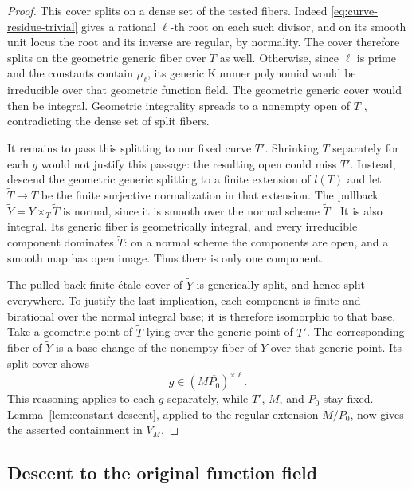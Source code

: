\begin{proof}
This cover splits on a dense set of the tested fibers.  Indeed
\eqref{eq:curve-residue-trivial} gives a rational $\ell$-th root on each
such divisor, and on its smooth unit locus the root and its inverse are
regular, by normality.  The cover therefore splits on the geometric
generic fiber over $T$ as well.  Otherwise, since $\ell$ is prime and
the constants contain $\mu_\ell$, its generic Kummer polynomial would
be irreducible over that geometric function field.  The geometric generic
cover would then be integral.  Geometric integrality spreads to a
nonempty open of $T$
\cite[Tags~\texttt{0578} and~\texttt{0559}]{Stacks}, contradicting the
dense set of split fibers.

It remains to pass this splitting to our fixed curve $T'$.  Shrinking $T$
separately for each $g$ would not justify this passage: the resulting open
could miss $T'$.  Instead, descend the geometric generic splitting to a
finite extension of $l(T)$ and let $\widetilde T\to T$ be the finite
surjective normalization in that extension.  The pullback
$\widetilde Y=Y\times_T\widetilde T$ is normal, since it is smooth over
the normal scheme $\widetilde T$ \cite[Tag~\texttt{034F}]{Stacks}.
It is also integral.  Its generic
fiber is geometrically integral, and every irreducible component dominates
$\widetilde T$: on a normal scheme the components are open, and a smooth
map has open image.  Thus there is only one component.

The pulled-back finite \'etale cover of $\widetilde Y$ is generically
split, and hence split everywhere.  To justify the last implication,
each component is finite and birational over the normal integral base;
it is therefore isomorphic to that base.  Take a geometric point of
$\widetilde T$ lying over the generic point of $T'$.  The corresponding
fiber of $\widetilde Y$ is a base change of the nonempty fiber of $Y$
over that generic point.  Its split cover shows
\begin{equation}
\label{eq:curve-geometric-root}
                            g\in(M\overline{P_0})^{\times\ell}.
\end{equation}
This reasoning applies to each $g$ separately, while $T'$, $M$, and
$P_0$ stay fixed.  Lemma~\ref{lem:constant-descent}, applied to the
regular extension $M/P_0$, now gives the asserted containment in $V_M$.
\end{proof}

\subsection{Descent to the original function field}

